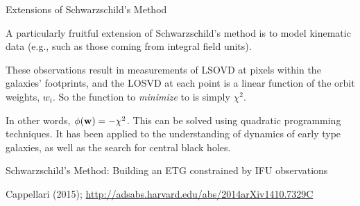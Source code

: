 \documentclass[letterpaper,landscape]{slides}
\begin{document}
\begin{slide}
\begin{center}
{\large \color{red} 
                  Extensions of Schwarzschild's Method }
\end{center}

A particularly fruitful extension of Schwarzschild's method is to model
kinematic data (e.g., such as those coming from integral field units).

These observations result in measurements of LSOVD at pixels within the
galaxies' footprints, and the LOSVD at each point is a linear function of
the orbit weights, $w_i$. So the function to {\em minimize} to is simply
$\chi^2$.

In other words, $\phi({\bf w}) = - \chi^2$. This can be solved using quadratic
programming techniques. It has been applied to the understanding of dynamics
of early type galaxies, as well as the search for central black holes.

\vfill
\end{slide}

\begin{slide}
\begin{center}
{\large \color{red} 
                  Schwarzschild's Method: Building an ETG constrained by IFU observations   }
\end{center}

\begin{center}
\vskip 1.0in
\vskip 1.0in
\end{center}

\begin{flushright}
Cappellari (2015); \url{http://adsabs.harvard.edu/abs/2014arXiv1410.7329C}
\end{flushright}

\vfill
\end{slide}
\end{document}
